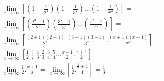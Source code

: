 \begin{ex}
\begin{align}
&\lim_{x\rightarrow \infty} \left[\left(1-\frac{1}{2^2}\right)\left(1-\frac{1}{3^2}\right)\dots\left(1-\frac{1}{x^2}\right)\right]=\nonumber\\
&\lim_{x\rightarrow \infty} \left[\left(\frac{2^2-1}{2^2}\right)\left(\frac{3^2-1}{3^2}\right)\dots\left(\frac{x^2-1}{x^2}\right)\right]=\nonumber\\
&\lim_{x\rightarrow \infty} \left[\frac{(2+1)(2-1)}{2^2}.\frac{(3+1)(3-1)}{3^2}.\frac{(x+1)(x-1)}{x^2}\right]=\nonumber\\
&\lim_{x\rightarrow \infty} \left[\frac{1}{2}.\frac{3}{2}.\frac{4}{3}.\frac{2}{3}.\frac{3}{4}.\frac{5}{4}\dots\frac{x-1}{2}.\frac{x+1}{2}\right]=\nonumber\\
&\lim_{x\rightarrow \infty} \frac{1}{2}.\frac{x+1}{x}=\lim_{x\rightarrow \infty} \left[\frac{1}{2}.\frac{\frac{1}{2}+1}{1}\right]=\frac{1}{3}\nonumber
\end{align}
\end{ex}